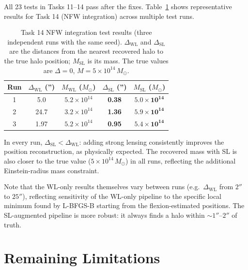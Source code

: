 \documentclass[12pt]{article}
\begin{document}
All 23 tests in Tasks 11--14 pass after the fixes.  Table~\ref{tab:results} shows
representative results for Task 14 (NFW integration) across multiple test runs.

\begin{table}[h!]
\centering
\caption{Task 14 NFW integration test results (three independent runs with the same
seed).  $\Delta_\mathrm{WL}$ and $\Delta_\mathrm{SL}$ are the distances from the nearest
recovered halo to the true halo position; $M_\mathrm{SL}$ is its mass.
The true values are $\Delta=0$, $M=5\times10^{14}\,M_\odot$.}
\label{tab:results}
\begin{tabular}{ccccc}
  \toprule
  Run & $\Delta_\mathrm{WL}$ ('') & $M_\mathrm{WL}$ ($M_\odot$) & $\Delta_\mathrm{SL}$ ('') & $M_\mathrm{SL}$ ($M_\odot$)\\
  \midrule
  1 & 5.0 & $5.2\times10^{14}$ & \textbf{0.38} & $\mathbf{5.0\times10^{14}}$\\
  2 & 24.7 & $3.2\times10^{14}$ & \textbf{1.36} & $\mathbf{5.9\times10^{14}}$\\
  3 & 1.97 & $5.2\times10^{14}$ & \textbf{0.95} & $\mathbf{5.4\times10^{14}}$\\
  \bottomrule
\end{tabular}
\end{table}

In every run, $\Delta_\mathrm{SL} < \Delta_\mathrm{WL}$: adding strong lensing
consistently improves the position reconstruction, as physically expected.  The recovered
mass with SL is also closer to the true value ($5\times10^{14}\,M_\odot$) in all runs,
reflecting the additional Einstein-radius mass constraint.

Note that the WL-only results themselves vary between runs (e.g.\ $\Delta_\mathrm{WL}$ from
$2''$ to $25''$), reflecting sensitivity of the WL-only pipeline to the specific local
minimum found by L-BFGS-B starting from the flexion-estimated positions.  The SL-augmented
pipeline is more robust: it always finds a halo within $\sim1''$--$2''$ of truth.

\section{Remaining Limitations}
\label{sec:limitations}
\end{document}
